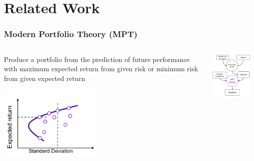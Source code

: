 \section{Related Work}
\begin{frame}
\frametitle{Modern Portfolio Theory (MPT)}
\begin{columns}
\begin{column}{0.55\textwidth}
Produce a portfolio from the prediction of future performance with maximum expected return from given risk or minimum risk from given expected return
\begin{center}
\includegraphics[width=5cm]{images/efficient_frontier.png}
\end{center}
\end{column}
\begin{column}{0.45\textwidth}
\begin{center}
\includegraphics[width=4.8cm]{images/mpt.png}
\end{center}
\end{column}
\end{columns}
\end{frame}



